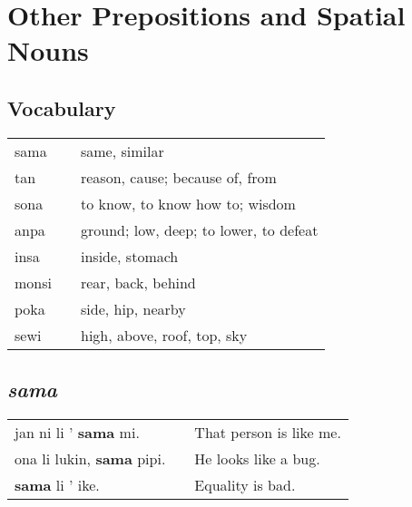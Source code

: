 \section{Other Prepositions and Spatial Nouns}
\subsection*{Vocabulary}
%
\begin{supertabular}{p{5,5cm}|ll}
sama && same, similar \\
tan && reason, cause; because of, from \\
sona && to know, to know how to; wisdom \\
anpa && ground; low, deep; to lower, to defeat \\ 
insa && inside, stomach \\
monsi && rear, back, behind \\
poka && side, hip, nearby \\
sewi && high, above, roof, top, sky \\
\end{supertabular} 
%
\subsection*{\textit{sama}}
%
\begin{supertabular}{p{5,5cm}|ll}
jan ni li ' \textbf{sama} mi. && That person is like me. \\
ona li lukin, \textbf{sama} pipi. && He looks like a bug. \\
\textbf{sama} li ' ike. && Equality is bad. \\
\end{supertabular} 
%
